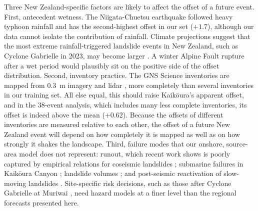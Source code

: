 Three New Zealand-specific factors are likely to affect the offset of a future event. First, antecedent wetness. The Niigata-Chuetsu earthquake followed heavy typhoon rainfall \citep{sassa2005} and has the second-highest offset in our set ($+1.7$), although our data cannot isolate the contribution of rainfall. Climate projections suggest that the most extreme rainfall-triggered landslide events in New Zealand, such as Cyclone Gabrielle in 2023, may become larger \citep{massey2025gabrielle,dreyer2026climate}. A winter Alpine Fault rupture after a wet period would plausibly sit on the positive side of the offset distribution. Second, inventory practice. The GNS Science inventories are mapped from 0.3~m imagery and lidar \citep{massey2020update}, more completely than several inventories in our training set. All else equal, this should raise Kaik\={o}ura's apparent offset, and in the 38-event analysis, which includes many less complete inventories, its offset is indeed above the mean ($+0.62$). Because the offsets of different inventories are measured relative to each other, the offset of a future New Zealand event will depend on how completely it is mapped as well as on how strongly it shakes the landscape. Third, failure modes that our onshore, source-area model does not represent: runout, which recent work shows is poorly captured by empirical relations for coseismic landslides \citep{grant2025runout}; submarine failures in Kaik\={o}ura Canyon \citep{gnesko2026kaikoura}; landslide volumes \citep{massey2020volume,karantanellis2026kaikoura}; and post-seismic reactivation of slow-moving landslides \citep{dahal2026insar}. Site-specific risk decisions, such as those after Cyclone Gabrielle at Muriwai \citep{howard2025muriwai}, need hazard models at a finer level than the regional forecasts presented here.

